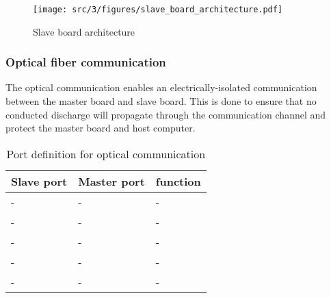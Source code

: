 \begin{figure}[!h]
  \centering
  \texttt{[image: src/3/figures/slave\_board\_architecture.pdf]}
  \caption{Slave board architecture}
  \label{fig:slave-board-architecture}
\end{figure}


\subsubsection{Optical fiber communication}

The optical communication enables an electrically-isolated communication between the master board and slave board.
This is done to ensure that no conducted discharge will propagate through the communication channel and protect the master board and host computer.

\begin{table}[!h]
\centering
\begin{tabular}{@{}lll@{}}
\toprule
Slave port      &  Master port      &  function       \\ \midrule
-               &  -                &  -              \\
-               &  -                &  -              \\
-               &  -                &  -              \\
-               &  -                &  -              \\
-               &  -                &  -              \\
\bottomrule
\end{tabular}
\caption{Port definition for optical communication}
\label{tab:port definition}
\end{table}



